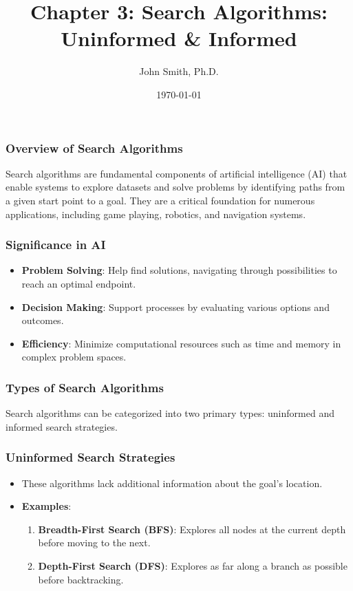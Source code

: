 \documentclass[aspectratio=169]{beamer}
\title[Search Algorithms]{Chapter 3: Search Algorithms: Uninformed \& Informed}
\author[J. Smith]{John Smith, Ph.D.}
\institute[University Name]{
  Department of Computer Science\\
  University Name\\
  \vspace{0.3cm}
  Email: email@university.edu\\
  Website: www.university.edu
}
\date{\today}
\begin{document}
\frame{\titlepage}

\begin{frame}[fragile]
    \titlepage
\end{frame}

\begin{frame}[fragile]
    \frametitle{Overview of Search Algorithms}
    Search algorithms are fundamental components of artificial intelligence (AI) that enable systems to explore datasets and solve problems by identifying paths from a given start point to a goal. They are a critical foundation for numerous applications, including game playing, robotics, and navigation systems.
\end{frame}

\begin{frame}[fragile]
    \frametitle{Significance in AI}
    \begin{itemize}
        \item \textbf{Problem Solving}: Help find solutions, navigating through possibilities to reach an optimal endpoint.
        \item \textbf{Decision Making}: Support processes by evaluating various options and outcomes.
        \item \textbf{Efficiency}: Minimize computational resources such as time and memory in complex problem spaces.
    \end{itemize}
\end{frame}

\begin{frame}[fragile]
    \frametitle{Types of Search Algorithms}
    Search algorithms can be categorized into two primary types: uninformed and informed search strategies.
\end{frame}

\begin{frame}[fragile]
    \frametitle{Uninformed Search Strategies}
    \begin{itemize}
        \item These algorithms lack additional information about the goal's location.
        \item \textbf{Examples}:
        \begin{enumerate}
            \item \textbf{Breadth-First Search (BFS)}: Explores all nodes at the current depth before moving to the next.
            \item \textbf{Depth-First Search (DFS)}: Explores as far along a branch as possible before backtracking.
        \end{enumerate}
    \end{itemize}
\end{frame}
\end{document}
